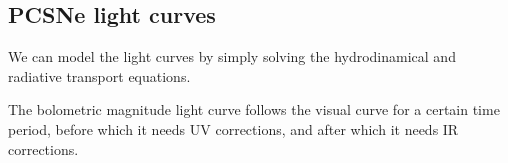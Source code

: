 \documentclass[main.tex]{subfiles}
\begin{document}
\subsection{PCSNe light curves}

We can model the light curves by simply solving the hydrodinamical and radiative transport equations.

The bolometric magnitude light curve follows the visual curve for a certain time period, before which it needs UV corrections, and after which it needs IR corrections.

\end{document}
